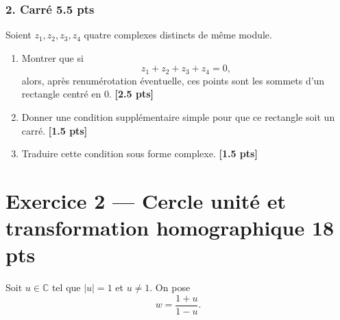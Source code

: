 \documentclass[11pt,a4paper]{article}
\newcommand{\C}{\mathbb{C}}
\newcommand{\bareme}[1]{\hfill{\small\textbf{[#1 pts]}}}
\begin{document}
\subsubsection*{2. Carré \hfill \textbf{5.5 pts}}

Soient \(z_1,z_2,z_3,z_4\) quatre complexes distincts de même module.

\begin{enumerate}[label=\textbf{D2.\arabic*.}]
    \item Montrer que si
    \[
    z_1+z_2+z_3+z_4=0,
    \]
    alors, après renumérotation éventuelle, ces points sont les sommets d'un rectangle centré en \(0\).
    \bareme{2.5}

    \item Donner une condition supplémentaire simple pour que ce rectangle soit un carré.
    \bareme{1.5}

    \item Traduire cette condition sous forme complexe.
    \bareme{1.5}
\end{enumerate}

\bigskip

\section*{Exercice 2 --- Cercle unité et transformation homographique \hfill \textbf{18 pts}}

Soit \(u\in\C\) tel que \(|u|=1\) et \(u\neq 1\). On pose
\[
w=\frac{1+u}{1-u}.
\]
\end{document}
